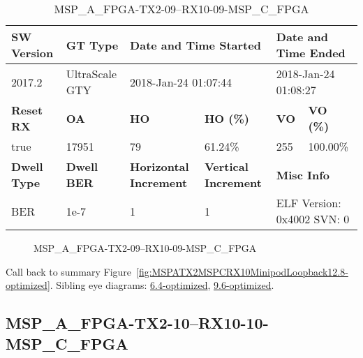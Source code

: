 \begin{table}[h]
\centering
\caption{MSP\_A\_FPGA-TX2-09--RX10-09-MSP\_C\_FPGA}
\label{tab:MSPAFPGATX209RX1009MSPCFPGA12.8-optimized}
\begin{tabular}{@{}|l|l|l|l|l|l|@{}}
\toprule
\textbf{SW Version}                & \textbf{GT Type}   & \multicolumn{2}{l|}{\textbf{Date and Time Started}}            & \multicolumn{2}{l|}{\textbf{Date and Time Ended}}        \\ \midrule
2017.2                       & UltraScale GTY          & \multicolumn{2}{l|}{2018-Jan-24 01:07:44}                   & \multicolumn{2}{l|}{2018-Jan-24 01:08:27}               \\ \midrule
\textbf{Reset RX}                  & \textbf{OA} & \textbf{HO}   & \textbf{HO (\%)} & \textbf{VO} & \textbf{VO (\%)} \\ \midrule
true & 17951        & 79          & 61.24\%        & 255        & 100.00\%       \\ \midrule
\textbf{Dwell Type}                & \textbf{Dwell BER} & \textbf{Horizontal Increment} & \textbf{Vertical Increment}    & \multicolumn{2}{l|}{\textbf{Misc Info}}                  \\ \midrule
BER                            & 1e-7        & 1        & 1           & \multicolumn{2}{l|}{ELF Version: 0x4002 SVN: 0}                         \\ \bottomrule
\end{tabular}
\end{table}

\begin{figure}[h]
\caption{MSP\_A\_FPGA-TX2-09--RX10-09-MSP\_C\_FPGA} \label{fig:MSPAFPGATX209RX1009MSPCFPGA12.8-optimized}
\end{figure}

Call back to summary Figure~\ref{fig:MSPATX2MSPCRX10MinipodLoopback12.8-optimized}.
Sibling eye diagrams: \hyperref[sec:MSPAFPGATX209RX1009MSPCFPGA6.4-optimized]{6.4-optimized}, \hyperref[sec:MSPAFPGATX209RX1009MSPCFPGA9.6-optimized]{9.6-optimized}.

\clearpage
\newpage


\subsection{MSP\_A\_FPGA-TX2-10--RX10-10-MSP\_C\_FPGA}\label{sec:MSPAFPGATX210RX1010MSPCFPGA12.8-optimized}

